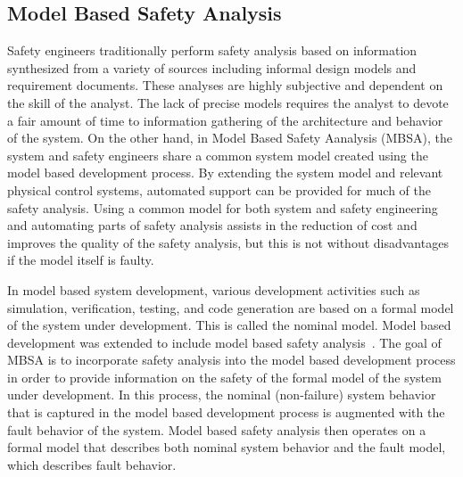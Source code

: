 \subsection{Model Based Safety Analysis}
\label{sec:mbsa}

Safety engineers traditionally perform safety analysis based on information synthesized from a variety of sources including informal design models and requirement documents. These analyses are highly subjective and dependent on the skill of the analyst. The lack of precise models requires the analyst to devote a fair amount of time to information gathering of the architecture and behavior of the system. On the other hand, in Model Based Safety Aanalysis (MBSA), the system and safety engineers share a common system model created using the model based development process. By extending the system model and relevant physical control systems, automated support can be provided for much of the safety analysis. Using a common model for both system and safety engineering and automating parts of safety analysis assists in the reduction of cost and improves the quality of the safety analysis, but this is not without disadvantages if the model itself is faulty. 

In model based system development, various development activities such as simulation, verification, testing, and code generation are based on a formal model of the system under development\cite{Joshi05:Dasc}. This is called the nominal model. Model based development was extended to include model based safety analysis~\cite{Joshi05:Dasc,Joshi05:SafeComp,Joshi07:Hase,DBLP:conf/cav/BozzanoCPJKPRT15,CAV2015:BoCiGrMa}. The goal of MBSA is to incorporate safety analysis into the model based development process in order to provide information on the safety of the formal model of the system under development. In this process, the nominal (non-failure) system behavior that is captured in the model based development process is augmented with the fault behavior of the system. Model based safety analysis then operates on a formal model that describes both nominal system behavior and the fault model, which describes fault behavior. 





